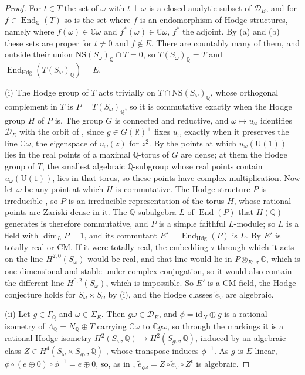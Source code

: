 \documentclass[11pt,reqno]{amsart}
\theoremstyle{plain}
\theoremstyle{definition}
\theoremstyle{remark}
\newcommand{\QQ}{\mathbb{Q}}
\newcommand{\RR}{\mathbb{R}}
\newcommand{\CC}{\mathbb{C}}
\newcommand{\cD}{\mathcal{D}}
\newcommand{\NS}{\mathrm{NS}}
\DeclareMathOperator{\End}{End}
\begin{document}
\begin{proof}
For $t\in T$ the set of $\omega$ with $t\perp\omega$ is a closed analytic
subset of $\cD_{E}$, and for $f\in\End_{\QQ}(T)$ so is the set where $f$ is
an endomorphism of Hodge structures, namely where $f(\omega)\in\CC\omega$ and
$f^{*}(\omega)\in\CC\omega$, $f^{*}$ the adjoint. By (a) and (b) these sets
are proper for $t\ne0$ and $f\notin E$. There are countably many of them, and
outside their union $\NS(S_{\omega})_{\QQ}\cap T=0$, so
$T(S_{\omega})_{\QQ}=T$ and $\End_{\mathrm{Hdg}}(T(S_{\omega})_{\QQ})=E$.

(i) The Hodge group of $T$ acts trivially on $T\cap\NS(S_{\omega})_{\QQ}$,
whose orthogonal complement in $T$ is $P=T(S_{\omega})_{\QQ}$, so it is
commutative exactly when the Hodge group $H$ of $P$ is. The group $G$ is
connected and reductive, and $\omega\mapsto u_{\omega}$ identifies $\cD_{E}$
with the orbit of , since $g\in G(\RR)^{+}$ fixes
$u_{\omega}$ exactly when it preserves the line $\CC\omega$, the eigenspace
of $u_{\omega}(z)$ for $z^{2}$. By  the points at which
$u_{\omega}(\mathrm{U}(1))$ lies in the real points of a maximal $\QQ$-torus of
$G$ are dense; at them the Hodge group of $T$, the smallest algebraic
$\QQ$-subgroup whose real points contain $u_{\omega}(\mathrm{U}(1))$, lies in
that torus, so these points have complex multiplication. Now let $\omega$ be
any point at which $H$ is commutative. The Hodge structure $P$ is
irreducible \cite{Zar83}, so $P$ is an irreducible representation of the
torus $H$, whose rational points are Zariski dense in it. The
$\QQ$-subalgebra $L$ of $\End(P)$ that $H(\QQ)$ generates is therefore
commutative, and $P$ is a simple faithful $L$-module; so $L$ is a field with
$\dim_{L}P=1$, and its commutant $E'=\End_{\mathrm{Hdg}}(P)$ is $L$. By
\cite{Zar83} $E'$ is totally real or CM. If it were totally real, the
embedding $\tau$ through which it acts on the line $H^{2,0}(S_{\omega})$
would be real, and that line would lie in $P\otimes_{E',\tau}\CC$, which is
one-dimensional and stable under complex conjugation, so it would also
contain the different line $H^{0,2}(S_{\omega})$, which is impossible. So
$E'$ is a CM field, the Hodge conjecture
holds for $S_{\omega}\times S_{\omega}$ by (i), and the
Hodge classes $\tilde e_{\omega}$ are algebraic.

(ii) Let $g\in\Gamma_{\QQ}$ and $\omega\in\Sigma_{E}$. Then $g\omega\in\cD_{E}$,
and $\phi=\mathrm{id}_{N}\oplus g$ is a rational isometry of
$\Lambda_{\QQ}=N_{\QQ}\oplus T$ carrying $\CC\omega$ to $\CC g\omega$, so
through the markings it is a rational Hodge isometry
$H^{2}(S_{\omega},\QQ)\to H^{2}(S_{g\omega},\QQ)$, induced by an algebraic
class $Z\in H^{4}(S_{\omega}\times S_{g\omega},\QQ)$ \cite{Bus19}, whose
transpose induces $\phi^{-1}$. As $g$ is $E$-linear,
$\phi\circ(e\oplus0)\circ\phi^{-1}=e\oplus0$, so, as in ,
$\tilde e_{g\omega}=Z\circ\tilde e_{\omega}\circ Z^{t}$ is algebraic.


\end{proof}
\end{document}
